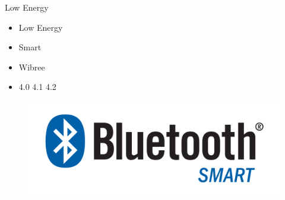 \begin{frame}
\begin{minipage}[t]{0.30\linewidth}
		\begin{block}{Low Energy}
			\begin{itemize}
				\item Low Energy
				\item Smart
				\item Wibree
				\item 4.0 4.1 4.2
			\end{itemize}
		\end{block}
		\begin{figure}
			\includegraphics[width=\linewidth]{img/Bluetooth_Smart_Logo.png}
		\end{figure}
	\end{minipage}
\end{frame}

\begin{frame}
\end{frame}

\begin{frame}
\end{frame}


